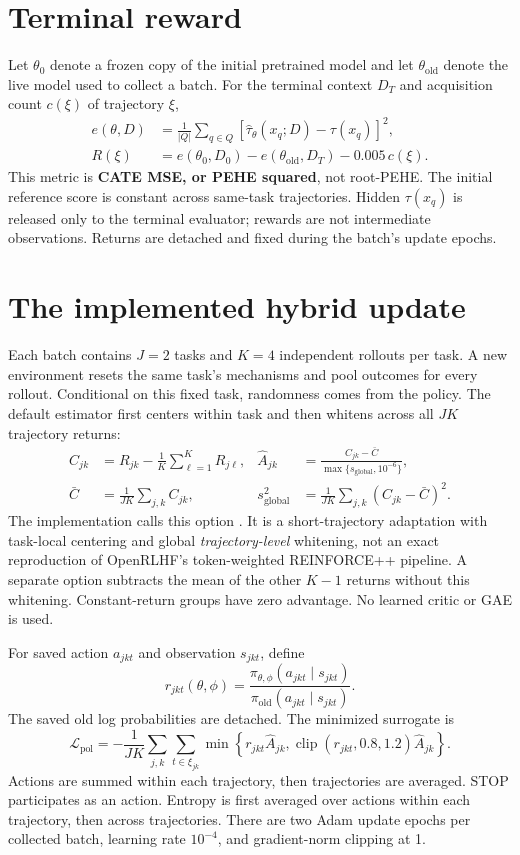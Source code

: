 \documentclass[10pt,a4paper]{article}
\newcommand{\code}[1]{\texttt{\detokenize{#1}}}
\begin{document}
\section{Terminal reward}
Let $\theta_0$ denote a frozen copy of the initial pretrained model and let
$\theta_{\mathrm{old}}$ denote the live model used to collect a batch. For the
terminal context $D_T$ and acquisition count $c(\xi)$ of trajectory $\xi$,
\begin{align}
 e(\theta,D)&=\frac{1}{|Q|}\sum_{q\in Q}
 [\widehat\tau_\theta(x_q;D)-\tau(x_q)]^2,\\
 R(\xi)&=e(\theta_0,D_0)-e(\theta_{\mathrm{old}},D_T)
 -0.005\,c(\xi).
\end{align}
This metric is \textbf{CATE MSE, or PEHE squared}, not root-PEHE. The initial
reference score is constant across same-task trajectories. Hidden $\tau(x_q)$
is released only to the terminal evaluator; rewards are not intermediate
observations. Returns are detached and fixed during the batch's update epochs.

\newpage
\section{The implemented hybrid update}
Each batch contains $J=2$ tasks and $K=4$ independent rollouts per task. A new
environment resets the same task's mechanisms and pool outcomes for every
rollout. Conditional on this fixed task, randomness comes from the policy.
The default estimator first centers within task and then whitens across all
$JK$ trajectory returns:
\begin{align}
 C_{jk}&=R_{jk}-\frac1K\sum_{\ell=1}^K R_{j\ell}, &
 \widehat A_{jk}&=\frac{C_{jk}-\bar C}
 {\max\{s_{\mathrm{global}},10^{-6}\}},\\[-0.2em]
 \bar C&=\frac1{JK}\sum_{j,k}C_{jk}, &
 s_{\mathrm{global}}^2&=\frac1{JK}\sum_{j,k}(C_{jk}-\bar C)^2.
\end{align}
The implementation calls this option \code{reinforcepp_baseline}. It is a
short-trajectory adaptation with task-local centering and global
\emph{trajectory-level} whitening, not an exact reproduction of OpenRLHF's
token-weighted REINFORCE++ pipeline. A separate \code{rloo} option subtracts
the mean of the other $K-1$ returns without this whitening. Constant-return
groups have zero advantage. No learned critic or GAE is used.

For saved action $a_{jkt}$ and observation $s_{jkt}$, define
\[
 r_{jkt}(\theta,\phi)=
 \frac{\pi_{\theta,\phi}(a_{jkt}\mid s_{jkt})}
 {\pi_{\mathrm{old}}(a_{jkt}\mid s_{jkt})}.
\]
The saved old log probabilities are detached. The minimized surrogate is
\[
 \mathcal L_{\mathrm{pol}}=-\frac1{JK}\sum_{j,k}\sum_{t\in\xi_{jk}}
 \min\!\left\{r_{jkt}\widehat A_{jk},
 \operatorname{clip}(r_{jkt},0.8,1.2)\widehat A_{jk}\right\}.
\]
Actions are summed within each trajectory, then trajectories are averaged.
STOP participates as an action. Entropy is first averaged over actions within
each trajectory, then across trajectories. There are two Adam update epochs
per collected batch, learning rate $10^{-4}$, and gradient-norm clipping at 1.
\end{document}
